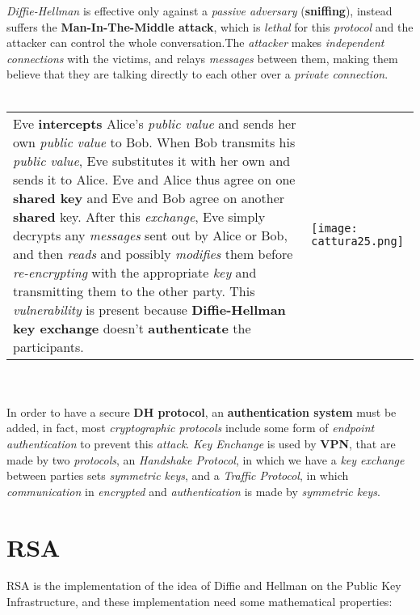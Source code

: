 \documentclass{article}
\begin{document}
\emph{Diffie-Hellman} is effective only against a \emph{passive adversary} (\textbf{sniffing}), instead suffers the \textbf{Man-In-The-Middle attack}, which is \emph{lethal} for this \emph{protocol} and the attacker can control the whole conversation.The \emph{attacker} makes \emph{independent connections} with the victims, and relays \emph{messages} between them, making them believe that they are talking directly to each other over a \emph{private connection}.\\\\
\begin{tabular}{C{9cm}  L{10cm}}
Eve \textbf{intercepts} Alice's \emph{public value} and sends her own \emph{public value} to Bob. When Bob transmits his \emph{public value}, Eve substitutes it with her own and sends it to Alice. Eve and Alice thus agree on one \textbf{shared key} and Eve and Bob agree on another \textbf{shared }key. After this \emph{exchange}, Eve simply decrypts any \emph{messages} sent out by Alice or Bob, and then \emph{reads} and possibly \emph{modifies} them before \emph{re-encrypting} with the appropriate \emph{key} and transmitting them to the other party. This \emph{vulnerability} is present because \textbf{Diffie-Hellman key exchange} doesn't \textbf{authenticate} the participants.
 & \texttt{[image: cattura25.png]}
\end{tabular}\\\\
In order to have a secure \textbf{DH protocol}, an \textbf{authentication system} must be added, in fact, most \emph{cryptographic protocols} include some form of \emph{endpoint authentication} to prevent this \emph{attack}. \emph{Key Enchange} is used by \textbf{VPN}, that are made by two \emph{protocols}, an \emph{Handshake Protocol}, in which we have a \emph{key exchange} between parties sets \emph{symmetric keys}, and a \emph{Traffic Protocol}, in which \emph{communication} in \emph{encrypted} and \emph{authentication} is made by \emph{symmetric keys}. 
\section{RSA}
RSA is the implementation of the idea of Diffie and Hellman on the Public Key Infrastructure, and these implementation need some mathematical properties:
\end{document}

